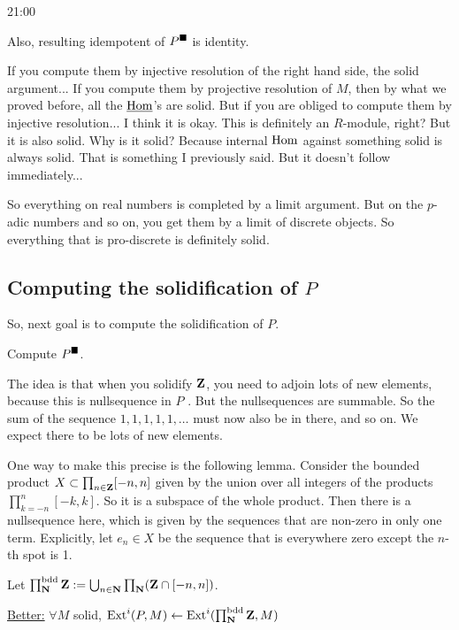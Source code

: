 \begin{unfinished}{21:00}
\begin{sketch}
Also, resulting idempotent of $P^\blacksquare$ is identity.

\end{sketch}

If you compute them by injective resolution of the right hand side, the solid argument... If you compute them by projective resolution of $M$, then by what we proved before, all the $\operatorname{\underline{Hom}}$'s are solid. But if you are obliged to compute them by injective resolution... I think it is okay. This is definitely an $R$-module, right? But it is also solid. Why is it solid? Because internal $\operatorname{Hom}$ against something solid is always solid. That is something I previously said. But it doesn't follow immediately...

%
So everything on real numbers is completed by a limit argument. But on the $p$-adic numbers and so on, you get them by a limit of discrete objects. So everything that is pro-discrete is definitely solid.

\subsection{Computing the solidification of $P$}

So, next goal is to compute the solidification of $P$. 

\begin{goal}
Compute $P^\blacksquare$.
\end{goal}

The idea is that when you solidify $\mathbf Z$, you need to adjoin lots of new elements, because this is nullsequence in $P$ . But the nullsequences are summable. So the sum of the sequence $1, 1, 1, 1, 1, \ldots$ must now also be in there, and so on. 
We expect there to be lots of new elements.

One way to make this precise is the following lemma. 
Consider the bounded product $X \subset \prod_{n \in \mathbf Z} [-n,n]$ given by the union over all integers of the products $\prod_{k=-n}^n [-k,k]$. So it is a subspace of the whole product. Then there is a nullsequence here, which is given by the sequences that are non-zero in only one term. Explicitly, let $e_n \in X$ be the sequence that is everywhere zero except the $n$-th spot is 1.

\begin{lemma}
Let $\prod_\mathbf N^{\mathrm{bdd}} \mathbf Z := \bigcup_{n \in \mathbf N} \prod_\mathbf N (\mathbf Z \cap [-n,n])$. %
\end{lemma}
\underline{Better:} $\forall M$ solid, $\operatorname{Ext}^i(P,M) \leftarrow \operatorname{Ext}^i(\prod_\mathbf N^{\mathrm{bdd}} \mathbf Z, M)$


\end{unfinished}
